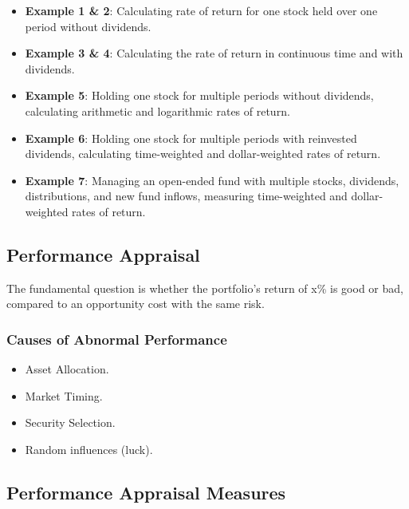\documentclass[
]{book}
\providecommand{\tightlist}{%
  \setlength{\itemsep}{0pt}\setlength{\parskip}{0pt}}
\begin{document}
\begin{itemize}
\tightlist
\item
  \textbf{Example 1 \& 2}: Calculating rate of return for one stock held
  over one period without dividends.
\item
  \textbf{Example 3 \& 4}: Calculating the rate of return in continuous
  time and with dividends.
\item
  \textbf{Example 5}: Holding one stock for multiple periods without
  dividends, calculating arithmetic and logarithmic rates of return.
\item
  \textbf{Example 6}: Holding one stock for multiple periods with
  reinvested dividends, calculating time-weighted and dollar-weighted
  rates of return.
\item
  \textbf{Example 7}: Managing an open-ended fund with multiple stocks,
  dividends, distributions, and new fund inflows, measuring
  time-weighted and dollar-weighted rates of return.
\end{itemize}

\hypertarget{performance-appraisal}{%
\subsection{Performance Appraisal}\label{performance-appraisal}}

The fundamental question is whether the portfolio's return of x\% is
good or bad, compared to an opportunity cost with the same risk.

\hypertarget{causes-of-abnormal-performance}{%
\subsubsection{Causes of Abnormal
Performance}\label{causes-of-abnormal-performance}}

\begin{itemize}
\tightlist
\item
  Asset Allocation.
\item
  Market Timing.
\item
  Security Selection.
\item
  Random influences (luck).
\end{itemize}

\hypertarget{performance-appraisal-measures}{%
\subsection{Performance Appraisal
Measures}\label{performance-appraisal-measures}}
\end{document}
